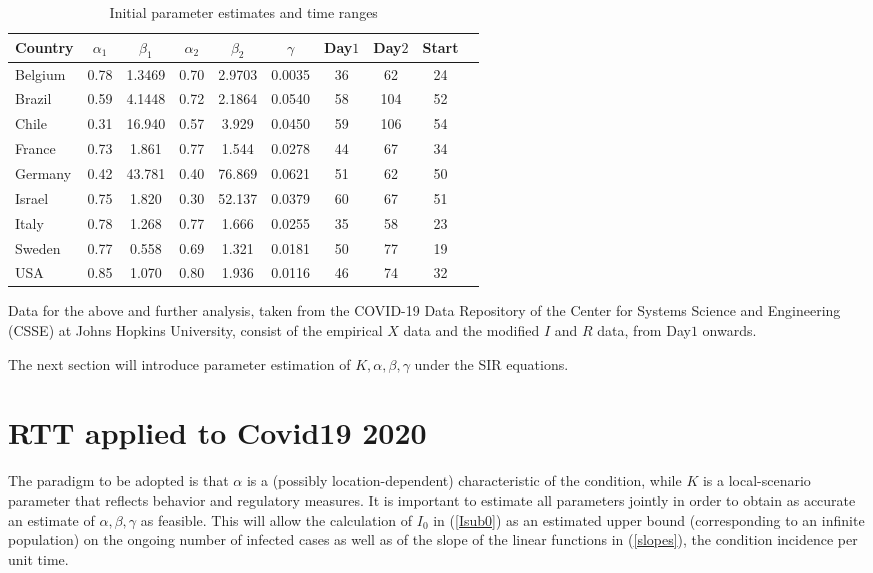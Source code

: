 \documentclass{article}
\begin{document}
\begin{table}
\begin{center}
\begin{tabular}{l|cccccccc|r}
Country & $\alpha_1$ & $\beta_1$ & $\alpha_2$ & $\beta_2$ & $\gamma$ & Day$1$ & Day$2$ & Start  & \\ \hline
Belgium & 0.78  & 1.3469   & 0.70   & 2.9703  & 0.0035   &  36  & 62   & 24 &   \\
Brazil  & 0.59    &4.1448       &  0.72     & 2.1864   & 0.0540   & 58   & 104 & 52      &   \\
Chile   & 0.31 &16.940 &0.57 &  3.929 & 0.0450 & 59 & 106 & 54 &  \\
France  & 0.73 & 1.861 &  0.77& 1.544 &0.0278 & 44 & 67 & 34 & \\
Germany & 0.42 & 43.781&0.40 & 76.869 & 0.0621 & 51 & 62 & 50 &  \\
Israel & 0.75 &  1.820& 0.30 & 52.137 & 0.0379& 60 & 67 & 51 & \\
Italy  & 0.78 & 1.268& 0.77 & 1.666 & 0.0255 & 35 & 58 & 23 & \\
Sweden &0.77 &0.558 & 0.69 & 1.321 & 0.0181 & 50 & 77 & 19 &    \\
USA   & 0.85 &1.070 & 0.80 &1.936 &0.0116 & 46 & 74 & 32 &   \\ \hline
\end{tabular}
\caption{
Initial parameter estimates and time ranges
\label{tabl}
}
\end{center}
\end{table}


\bigskip

Data for the above and further analysis, taken from the COVID-19 Data Repository of
the Center for Systems Science and Engineering (CSSE) at Johns Hopkins
University, consist of the empirical $X$ data and the modified $I$ and $R$ data, from Day$1$ onwards.

The next section will introduce parameter estimation of $K,\alpha, \beta,\gamma$ under the SIR equations.

\section{RTT applied to Covid19 2020} \label{RTTsection}

The paradigm to be adopted is that $\alpha$ is a (possibly location-dependent) characteristic of the condition, while $K$ is a local-scenario parameter that reflects behavior and regulatory measures. It is important to estimate all parameters jointly in order to obtain as accurate an estimate of $\alpha, \beta, \gamma$ as feasible. This will allow the calculation of $I_0$ in (\ref{Isub0}) as an estimated upper bound (corresponding to an infinite population) on the ongoing number of infected cases as well as of the slope of the linear functions in (\ref{slopes}), the condition incidence per unit time.
\end{document}
